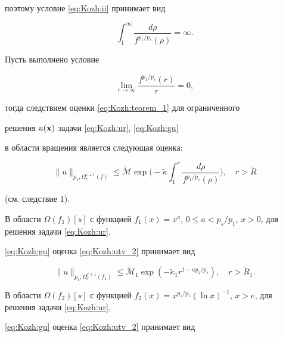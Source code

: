 поэтому условие \eqref{eq:Kozh:ii} принимает вид

\begin{equation}

\int_{1}^{\infty}\frac{d\rho}{f^{p_1/p_s}(\rho)}=\infty.\label{eq:Kozh:infty_I}

\end{equation}



Пусть выполнено условие

\begin{equation}

\lim_{r\to\infty}\frac{f^{p_1/p_s}(r)}{r}=0,\label{eq:Kozh:yclov}

\end{equation}

тогда следствием оценки \eqref{eq:Kozh:teorem_1} для ограниченного

решения $u(\bf{x})$ задачи \eqref{eq:Kozh:ur}, \eqref{eq:Kozh:gu}

в области вращения является следующая оценка:

\begin{equation}

\|u\|_{p_1,\Omega_{r}^{r+1}(f)}\leq \widetilde{\mathcal{M}}

\exp\biggl(-\widetilde{\kappa}\int_{1}^{r}\frac{d\rho}{f^{p_1/p_s}(\rho)}\biggr),

\quad r>\widetilde{R}\label{eq:Kozh:utv_2}

\end{equation}

(см. следствие 1).



В области $\Omega(f_1)[s]$ с функцией $f_1(x)=x^a$, $0\leq

a<p_s/p_1$, $x>0$, для решения задачи \eqref{eq:Kozh:ur},

\eqref{eq:Kozh:gu} оценка \eqref{eq:Kozh:utv_2} принимает вид

$$

\|u\|_{p_1,\Omega_r^{r+1}(f_1)}\leq

\widetilde{\mathcal{M}}_1 \exp\left(-\widetilde{\kappa}_1 r^{1-ap_1/p_s}\right), \quad r>\widetilde{R}_1.

$$



В области $\Omega(f_2)[s]$ с функцией $f_2(x)=x^{p_s/p_1}(\ln

x)^{-1}$, $x>e$, для решения задачи \eqref{eq:Kozh:ur},

\eqref{eq:Kozh:gu} оценка \eqref{eq:Kozh:utv_2} принимает вид

